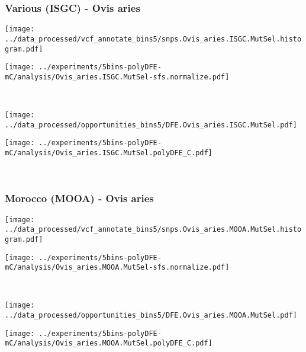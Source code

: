 \subsubsection{Various (ISGC) - Ovis aries}

\begin{minipage}{0.49\linewidth}
    \texttt{[image: ../data\_processed/vcf\_annotate\_bins5/snps.Ovis\_aries.ISGC.MutSel.histogram.pdf]}
\end{minipage}
\begin{minipage}{0.49\linewidth}
    \texttt{[image: ../experiments/5bins-polyDFE-mC/analysis/Ovis\_aries.ISGC.MutSel-sfs.normalize.pdf]}
\end{minipage}
\\
\begin{minipage}{0.49\linewidth}
    \texttt{[image: ../data\_processed/opportunities\_bins5/DFE.Ovis\_aries.ISGC.MutSel.pdf]}
\end{minipage}
\begin{minipage}{0.49\linewidth}
    \texttt{[image: ../experiments/5bins-polyDFE-mC/analysis/Ovis\_aries.ISGC.MutSel.polyDFE\_C.pdf]}
\end{minipage}
\\

\subsubsection{Morocco (MOOA) - Ovis aries}

\begin{minipage}{0.49\linewidth}
    \texttt{[image: ../data\_processed/vcf\_annotate\_bins5/snps.Ovis\_aries.MOOA.MutSel.histogram.pdf]}
\end{minipage}
\begin{minipage}{0.49\linewidth}
    \texttt{[image: ../experiments/5bins-polyDFE-mC/analysis/Ovis\_aries.MOOA.MutSel-sfs.normalize.pdf]}
\end{minipage}
\\
\begin{minipage}{0.49\linewidth}
    \texttt{[image: ../data\_processed/opportunities\_bins5/DFE.Ovis\_aries.MOOA.MutSel.pdf]}
\end{minipage}
\begin{minipage}{0.49\linewidth}
    \texttt{[image: ../experiments/5bins-polyDFE-mC/analysis/Ovis\_aries.MOOA.MutSel.polyDFE\_C.pdf]}
\end{minipage}
\\
